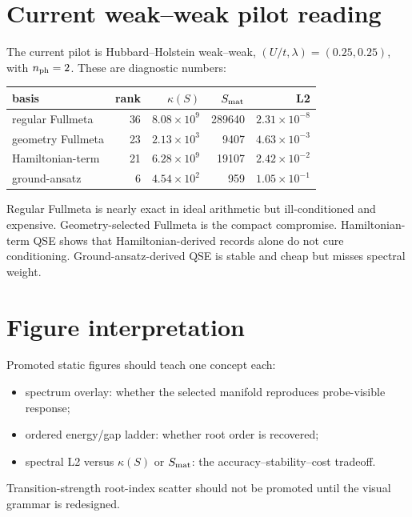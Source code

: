 \documentclass[10pt,twocolumn]{article}
\begin{document}
\section{Current weak--weak pilot reading}

The current pilot is Hubbard--Holstein weak--weak, \((U/t,\lambda)=(0.25,0.25)\), with \(n_{\rm ph}=2\). These are diagnostic numbers:
\begin{center}
\footnotesize
\begin{tabular}{lrrrr}
\toprule
basis & rank & \(\kappa(S)\) & \(S_{\rm mat}\) & L2\\
\midrule
regular Fullmeta & 36 & \(8.08{\times}10^9\) & 289640 & \(2.31{\times}10^{-8}\)\\
geometry Fullmeta & 23 & \(2.13{\times}10^3\) & 9407 & \(4.63{\times}10^{-3}\)\\
Hamiltonian-term & 21 & \(6.28{\times}10^9\) & 19107 & \(2.42{\times}10^{-2}\)\\
ground-ansatz & 6 & \(4.54{\times}10^2\) & 959 & \(1.05{\times}10^{-1}\)\\
\bottomrule
\end{tabular}
\end{center}
Regular Fullmeta is nearly exact in ideal arithmetic but ill-conditioned and expensive. Geometry-selected Fullmeta is the compact compromise. Hamiltonian-term QSE shows that Hamiltonian-derived records alone do not cure conditioning. Ground-ansatz-derived QSE is stable and cheap but misses spectral weight.

\section{Figure interpretation}

Promoted static figures should teach one concept each:
\begin{itemize}
\item spectrum overlay: whether the selected manifold reproduces probe-visible response;
\item ordered energy/gap ladder: whether root order is recovered;
\item spectral L2 versus \(\kappa(S)\) or \(S_{\rm mat}\): the accuracy--stability--cost tradeoff.
\end{itemize}
Transition-strength root-index scatter should not be promoted until the visual grammar is redesigned.
\end{document}
